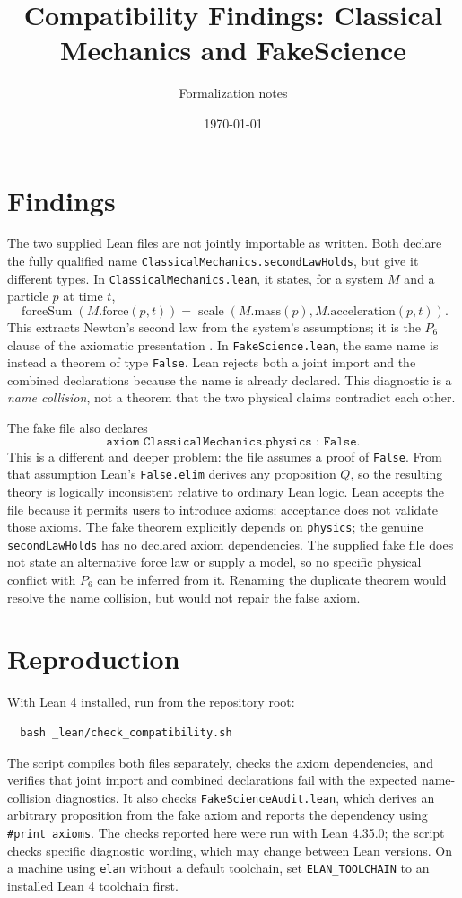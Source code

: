 \documentclass[11pt]{article}
\title{Compatibility Findings: Classical Mechanics and FakeScience}
\author{Formalization notes}
\date{\today}
\begin{document}
\maketitle

\section{Findings}

The two supplied Lean files are not jointly importable as written. Both
declare the fully qualified name
\texttt{ClassicalMechanics.secondLawHolds}, but give it different types.
In \texttt{ClassicalMechanics.lean}, it states, for a system $M$ and a
particle $p$ at time $t$,
\[
  \operatorname{forceSum}(M.\mathrm{force}(p,t))
  = \operatorname{scale}(M.\mathrm{mass}(p),M.\mathrm{acceleration}(p,t)).
\]
This extracts Newton's second law from the system's assumptions; it is
the $P_6$ clause of the axiomatic presentation
\cite{mckinsey1953axiomatic}. In \texttt{FakeScience.lean}, the same
name is instead a theorem of type \texttt{False}. Lean rejects both a
joint import and the combined declarations because the name is already
declared. This diagnostic is a \emph{name collision}, not a theorem that
the two physical claims contradict each other.

The fake file also declares
\[
  \texttt{axiom ClassicalMechanics.physics : False}.
\]
This is a different and deeper problem: the file assumes a proof of
\texttt{False}. From that assumption Lean's \texttt{False.elim} derives
any proposition $Q$, so the resulting theory is logically inconsistent
relative to ordinary Lean logic. Lean accepts the file because it permits
users to introduce axioms; acceptance does not validate those axioms.
The fake theorem explicitly depends on \texttt{physics}; the genuine
\texttt{secondLawHolds} has no declared axiom dependencies. The supplied
fake file does not state an alternative force law or supply a model, so
no specific physical conflict with $P_6$ can be inferred from it.
Renaming the duplicate theorem would resolve the name collision, but
would not repair the false axiom.

\section{Reproduction}

With Lean 4 installed, run from the repository root:
\begin{verbatim}
  bash _lean/check_compatibility.sh
\end{verbatim}
The script compiles both files separately, checks the axiom dependencies,
and verifies that joint import and combined declarations fail with the
expected name-collision diagnostics. It also checks
\texttt{FakeScienceAudit.lean}, which derives an arbitrary proposition
from the fake axiom and reports the dependency using \texttt{\#print axioms}.
The checks reported here were run with Lean 4.35.0; the script checks
specific diagnostic wording, which may change between Lean versions.
On a machine using \texttt{elan} without a default toolchain, set
\texttt{ELAN\_TOOLCHAIN} to an installed Lean 4 toolchain first.
\end{document}
